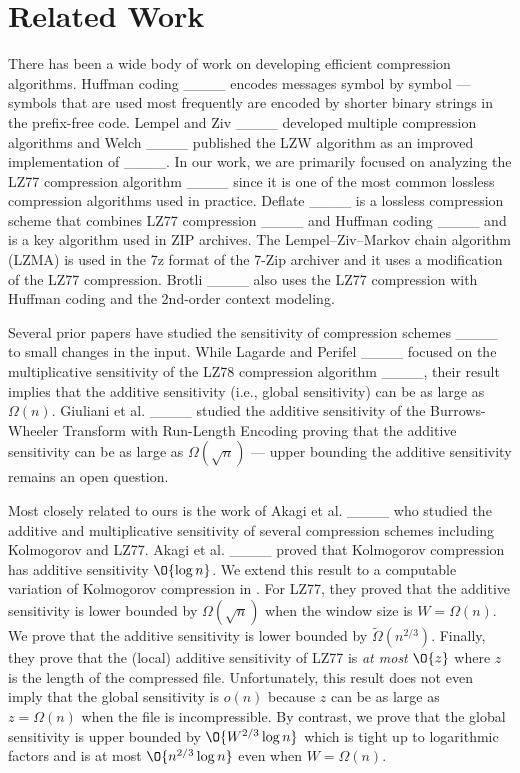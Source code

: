\section{Related Work}
There has been a wide body of work on developing efficient compression algorithms. Huffman coding ____ encodes messages symbol by symbol --- symbols that are used most frequently are encoded by shorter binary strings in the prefix-free code. Lempel and Ziv ____ developed multiple compression algorithms and Welch ____ published the LZW algorithm as an improved implementation of ____. In our work, we are primarily focused on analyzing the LZ77 compression algorithm ____ since it is one of the most common lossless compression algorithms used in practice. Deflate ____ is a lossless compression scheme that combines LZ77 compression ____ and Huffman coding ____ and is a key algorithm used in ZIP archives. The Lempel–Ziv–Markov chain algorithm (LZMA) is used in the 7z format of the 7-Zip archiver and it uses a modification of the LZ77 compression. Brotli ____ also uses the LZ77 compression with Huffman coding and the 2nd-order context modeling. 

Several prior papers have studied the sensitivity of compression schemes ____ to small changes in the input. While Lagarde and Perifel ____ focused on the multiplicative sensitivity of the LZ78 compression algorithm ____, their result implies that the additive sensitivity (i.e., global sensitivity) can be as large as $\Omega(n)$. Giuliani et al. ____ studied the additive sensitivity of the Burrows-Wheeler Transform with Run-Length Encoding proving that the additive sensitivity can be as large as $\Omega(\sqrt{n})$ --- upper bounding the additive sensitivity remains an open question. 

Most closely related to ours is the work of Akagi et al. ____ who studied the additive and multiplicative sensitivity of several compression schemes including Kolmogorov and LZ77. Akagi et al. ____ proved that Kolmogorov compression has additive sensitivity $\O{\log n}$. We extend this result to a computable variation of Kolmogorov compression in . For LZ77, they proved that the additive sensitivity is lower bounded by $\Omega(\sqrt{n})$ when the window size is $W=\Omega(n)$. We prove that the additive sensitivity is lower bounded by $\widetilde\Omega(n^{2/3})$. Finally, they prove that the (local) additive sensitivity of LZ77 is {\em at most} $\O{z}$ where $z$ is the length of the compressed file. Unfortunately, this result does not even imply that the global sensitivity is $o(n)$ because $z$ can be as large as $z= \Omega(n)$ when the file is incompressible. By contrast, we prove that the global sensitivity is upper bounded by $\O{W^{2/3} \log n}$ which is tight up to logarithmic factors and is at most $\O{n^{2/3} \log n}$ even when $W = \Omega(n)$.


